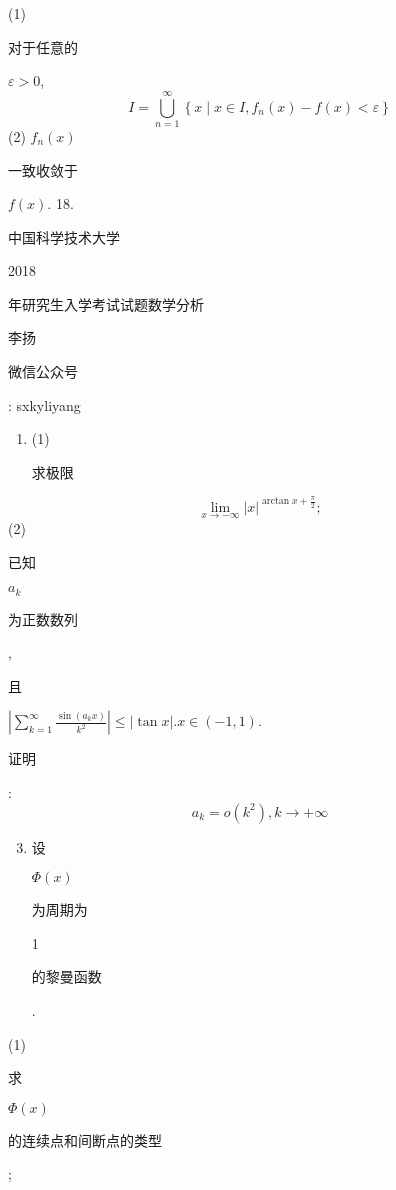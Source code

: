 \documentclass[10pt]{article}
\begin{document}
(1) \begin{CJK}{UTF8}{mj}对于任意的\end{CJK} $\varepsilon>0$,
$$
I=\bigcup_{n=1}^{\infty}\left\{x \mid x \in I, f_{n}(x)-f(x)<\varepsilon\right\}
$$
(2) $f_{n}(x)$ \begin{CJK}{UTF8}{mj}一致收敛于\end{CJK} $f(x)$. 18. \begin{CJK}{UTF8}{mj}中国科学技术大学\end{CJK} 2018 \begin{CJK}{UTF8}{mj}年研究生入学考试试题数学分析\end{CJK}

\begin{CJK}{UTF8}{mj}李扬\end{CJK}

\begin{CJK}{UTF8}{mj}微信公众号\end{CJK}: sxkyliyang

\begin{enumerate}
  \item (1) \begin{CJK}{UTF8}{mj}求极限\end{CJK}
\end{enumerate}
$$
\lim _{x \rightarrow-\infty}|x|^{\arctan x+\frac{\pi}{2}} ;
$$
(2) \begin{CJK}{UTF8}{mj}已知\end{CJK} $a_{k}$ \begin{CJK}{UTF8}{mj}为正数数列\end{CJK}, \begin{CJK}{UTF8}{mj}且\end{CJK} $\left|\sum_{k=1}^{\infty} \frac{\sin \left(a_{k} x\right)}{k^{2}}\right| \leqslant|\tan x| . x \in(-1,1)$. \begin{CJK}{UTF8}{mj}证明\end{CJK}:
$$
a_{k}=o\left(k^{2}\right), k \rightarrow+\infty
$$

\begin{enumerate}
  \setcounter{enumi}{2}
  \item \begin{CJK}{UTF8}{mj}设\end{CJK} $\Phi(x)$ \begin{CJK}{UTF8}{mj}为周期为\end{CJK} 1 \begin{CJK}{UTF8}{mj}的黎曼函数\end{CJK}.
\end{enumerate}
(1) \begin{CJK}{UTF8}{mj}求\end{CJK} $\Phi(x)$ \begin{CJK}{UTF8}{mj}的连续点和间断点的类型\end{CJK};
\end{document}
